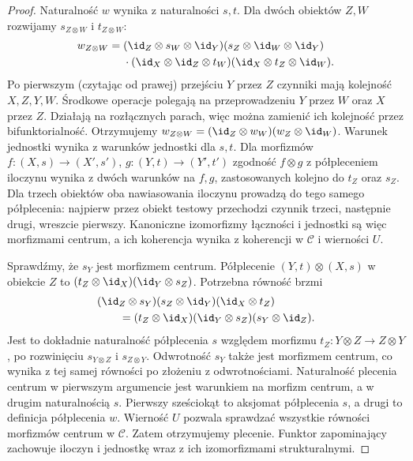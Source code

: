 \begin{proof}
Naturalność $w$ wynika z naturalności $s,t$. Dla dwóch obiektów $Z,W$ rozwijamy $s_{Z\otimes W}$ i $t_{Z\otimes W}$:
\[
\begin{aligned}
 w_{Z\otimes W}
 ={}&(\id_Z\otimes s_W\otimes\id_Y)
 (s_Z\otimes\id_W\otimes\id_Y)\\
 &\cdot(\id_X\otimes\id_Z\otimes t_W)
 (\id_X\otimes t_Z\otimes\id_W).
\end{aligned}
\]
Po pierwszym (czytając od prawej) przejściu $Y$ przez $Z$ czynniki mają kolejność $X,Z,Y,W$. Środkowe operacje polegają na przeprowadzeniu $Y$ przez $W$ oraz $X$ przez $Z$. Działają na rozłącznych parach, więc można zamienić ich kolejność przez bifunktorialność. Otrzymujemy
$w_{Z\otimes W}=(\id_Z\otimes w_W)(w_Z\otimes\id_W)$.
Warunek jednostki wynika z warunków jednostki dla $s,t$. Dla morfizmów $f:(X,s)\to(X',s')$, $g:(Y,t)\to(Y',t')$ zgodność $f\otimes g$ z półpleceniem iloczynu wynika z dwóch warunków na $f,g$, zastosowanych kolejno do $t_Z$ oraz $s_Z$. Dla trzech obiektów oba nawiasowania iloczynu prowadzą do tego samego półplecenia: najpierw przez obiekt testowy przechodzi czynnik trzeci, następnie drugi, wreszcie pierwszy. Kanoniczne izomorfizmy łączności i jednostki są więc morfizmami centrum, a ich koherencja wynika z koherencji w $\mathcal C$ i wierności $U$.

Sprawdźmy, że $s_Y$ jest morfizmem centrum. Półplecenie $(Y,t)\otimes(X,s)$ w obiekcie $Z$ to $(t_Z\otimes\id_X)(\id_Y\otimes s_Z)$. Potrzebna równość brzmi
\[
\begin{aligned}
 &(\id_Z\otimes s_Y)(s_Z\otimes\id_Y)(\id_X\otimes t_Z)\\
 &\qquad=(t_Z\otimes\id_X)(\id_Y\otimes s_Z)(s_Y\otimes\id_Z).
\end{aligned}
\]
Jest to dokładnie naturalność półplecenia $s$ względem morfizmu $t_Z:Y\otimes Z\to Z\otimes Y$, po rozwinięciu $s_{Y\otimes Z}$ i $s_{Z\otimes Y}$. Odwrotność $s_Y$ także jest morfizmem centrum, co wynika z tej samej równości po złożeniu z odwrotnościami. Naturalność plecenia centrum w pierwszym argumencie jest warunkiem na morfizm centrum, a w drugim naturalnością $s$. Pierwszy sześciokąt to aksjomat półplecenia $s$, a drugi to definicja półplecenia $w$. Wierność $U$ pozwala sprawdzać wszystkie równości morfizmów centrum w $\mathcal C$. Zatem otrzymujemy plecenie. Funktor zapominający zachowuje iloczyn i jednostkę wraz z ich izomorfizmami strukturalnymi.
\end{proof}

